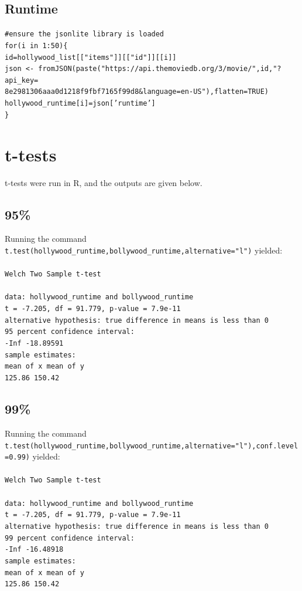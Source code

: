 \documentclass{article}
\begin{document}
\subsection{Runtime}
\label{sec:runtime}
\texttt{\#ensure the jsonlite library is loaded\\
for(i in 1:50)\{\\
\quad id=hollywood\_list[["items"]][["id"]][[i]]\\
\quad json <- fromJSON(paste("https://api.themoviedb.org/3/movie/",id,"?api\_key=\\8e2981306aaa0d1218f9fbf7165f99d8\&language=en-US"),flatten=TRUE)\\
\quad hollywood\_runtime[i]=json['runtime']\\
\}}
\section{t-tests}
t-tests were run in R, and the outputs are given below.
\subsection{95\%}
\label{sec:95}
Running the command \texttt{t.test(hollywood\_runtime,bollywood\_runtime,alternative="l")} yielded:\\\\
\texttt{Welch Two Sample t-test\\
\\
data:  hollywood\_runtime and bollywood\_runtime\\
t = -7.205, df = 91.779, p-value = 7.9e-11\\
alternative hypothesis: true difference in means is less than 0\\
95 percent confidence interval:\\
      -Inf -18.89591\\
sample estimates:\\
mean of x mean of y\\ 
   125.86    150.42}
\subsection{99\%}
\label{sec:99}
Running the command \texttt{t.test(hollywood\_runtime,bollywood\_runtime,alternative="l"),conf.level=0.99)} yielded:\\\\
\texttt{Welch Two Sample t-test\\
\\
data:  hollywood\_runtime and bollywood\_runtime\\
t = -7.205, df = 91.779, p-value = 7.9e-11\\
alternative hypothesis: true difference in means is less than 0\\
99 percent confidence interval:\\
      -Inf -16.48918\\
sample estimates:\\
mean of x mean of y\\
   125.86    150.42}
\end{document}
